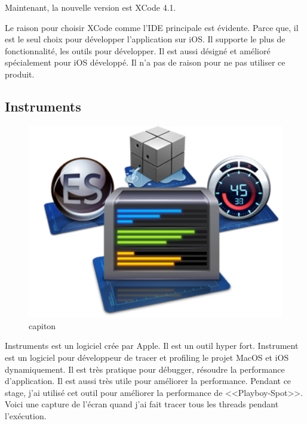 Maintenant, la nouvelle version est XCode 4.1. 

Le raison pour choisir XCode comme l'IDE principale est évidente. Parce que, il est le seul choix pour développer l'application sur iOS. Il supporte le plus de fonctionnalité, les outils pour développer. Il est aussi désigné et amélioré spécialement pour iOS développé. Il n'a pas de raison pour ne pas utiliser ce produit.


\subsection{Instruments} %
\label{sub:instrument}

\begin{figure}[htbp]
	\centering
		\includegraphics[width=6in]{Image/instrumentslogo.jpg}
	\caption{capiton}
	\label{fig:Image_instrumentslogo}
\end{figure}

Instruments est un logiciel crée par Apple. Il est un outil hyper fort. Instrument est un logiciel pour développeur de tracer et profiling le projet MacOS et iOS dynamiquement. Il est très pratique pour débugger, résoudre la performance d'application. Il est aussi très utile pour améliorer la performance. Pendant ce stage, j'ai utilisé cet outil pour améliorer la performance de <<Playboy-Spot>>. 
Voici une capture de l'écran quand j'ai fait tracer tous les threads pendant l'exécution. 


